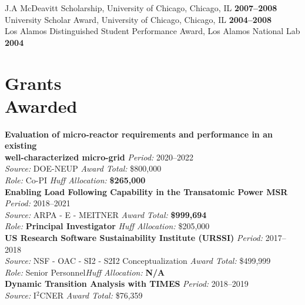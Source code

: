 \documentclass[margin,line]{resume}
\begin{document}
\begin{resume}
                J.A  McDeavitt Scholarship, University of Chicago, Chicago, IL                 \hfill\textbf{2007--2008}\vspace{.5mm}\\%
                University Scholar Award, University of Chicago, Chicago, IL                   \hfill\textbf{2004--2008}\vspace{.5mm}\\%
                Los Alamos Distinguished Student Performance Award, Los Alamos National Lab                         \hfill\textbf{2004}%
    \section{\mysidestyle Grants\\Awarded}
    \textbf{Evaluation of micro-reactor requirements and performance in an 
    existing \\
    well-characterized micro-grid} \hfill \textsl{Period:} 2020--2022\\
    \textsl{Source:} DOE-NEUP \hfill \textsl{Award Total:} \$800,000\\
    \textsl{Role:} Co-PI \hfill \textsl{Huff Allocation:} \textbf{\$265,000}\vspace{2mm}\\%
    \textbf{Enabling Load Following Capability in the Transatomic Power MSR} \hfill \textsl{Period:}
    2018--2021\\
    \textsl{Source:} ARPA - E - MEITNER \hfill \textsl{Award Total:} \textbf{\$999,694}\\
    \textsl{Role:} \textbf{Principal Investigator} \hfill \textsl{Huff Allocation:} \$205,000\vspace{2mm}\\%
    \textbf{US Research Software Sustainability Institute (URSSI)} \hfill \textsl{Period:}
    2017--2018\\
    \textsl{Source:} NSF - OAC - SI2 - S2I2 Conceptualization \hfill \textsl{Award Total:} \$499,999\\
    \textsl{Role:} Senior Personnel\hfill \textsl{Huff Allocation:} \textbf{N/A}\vspace{2mm}\\%
    \textbf{Dynamic Transition Analysis with TIMES} \hfill \textsl{Period:}
    2018--2019\\
    \textsl{Source:} I$^2$CNER \hfill \textsl{Award Total:} \$76,359\\

\end{resume}
\end{document}
